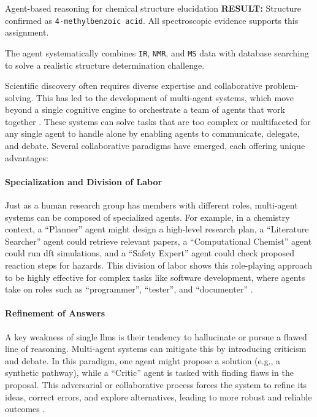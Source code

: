 \begin{examplebox}[label={example:structure_eluc}]{Agent-based reasoning for chemical structure elucidation}
\textbf{RESULT:} Structure confirmed as \texttt{4-methylbenzoic acid}. All spectroscopic evidence supports this assignment.

The agent systematically combines \texttt{IR}, \texttt{NMR}, and \texttt{MS} data with database searching to solve a realistic structure determination challenge.
\end{examplebox}

Scientific discovery often requires diverse expertise and collaborative problem-solving. This has led to the development of multi-agent systems, which move beyond a single cognitive engine to orchestrate a team of agents that work together \autocite{wu2023autogen}. These systems can solve tasks that are too complex or multifaceted for any single agent to handle alone by enabling agents to communicate, delegate, and debate. \autocite{lazaridou2020emergent}
Several collaborative paradigms have emerged, each offering unique advantages:

\paragraph{Specialization and Division of Labor} \label{sec:multi-agent}
Just as a human research group has members with different roles, multi-agent systems can be composed of specialized agents. For example, in a chemistry context, a \enquote{Planner} agent might design a high-level research plan, a \enquote{Literature Searcher} agent could retrieve relevant papers, a \enquote{Computational Chemist} agent could run \gls{dft} simulations, and a \enquote{Safety Expert} agent could check proposed reaction steps for hazards.\autocite{Zou2025ElAgente} This division of labor shows this role-playing approach to be highly effective for complex tasks like software development, where agents take on roles such as \enquote{programmer}, \enquote{tester}, and \enquote{documenter} \autocite{qian2024chatdevcommunicativeagentssoftware}.

\paragraph{Refinement of Answers} A key weakness of single \glspl{llm} is their tendency to hallucinate or pursue a flawed line of reasoning. Multi-agent systems can mitigate this by introducing criticism and debate. In this paradigm, one agent might propose a solution (e.g., a synthetic pathway), while a \enquote{Critic} agent is tasked with finding flaws in the proposal. This adversarial or collaborative process forces the system to refine its ideas, correct errors, and explore alternatives, leading to more robust and reliable outcomes \autocite{liang2024encouragingdivergentthinkinglarge, du2023improving}. 

